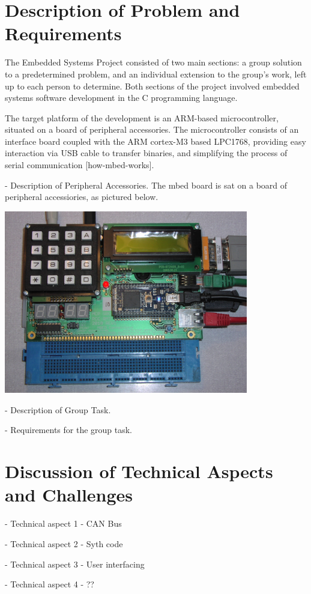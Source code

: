 \section{Description of Problem and Requirements}
The Embedded Systems Project consisted of two main sections: a group solution 
to a predetermined problem, and an individual extension to the group's work, 
left up to each person to determine. Both sections of the project involved 
embedded systems software development in the C programming language. 

The target platform of the development is an ARM-based microcontroller, 
situated on a board of peripheral accessories. The microcontroller consists of 
an interface board coupled with the ARM cortex-M3 based LPC1768, providing easy 
interaction via USB cable to transfer binaries, and simplifying the process of 
serial communication [how-mbed-works].

- Description of Peripheral Accessories.
The mbed board is sat on a board of peripheral accessiories, as pictured below. 

\includegraphics[width=0.80\textwidth]{./mbed_board}

- Description of Group Task.

- Requirements for the group task.


\section{Discussion of Technical Aspects and Challenges}

- Technical aspect 1 - CAN Bus 

- Technical aspect 2 - Syth code 

- Technical aspect 3 - User interfacing 

- Technical aspect 4 - ??

